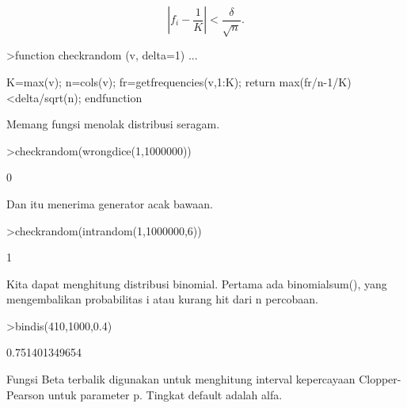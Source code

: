 \documentclass{article}
\begin{document}
\begin{eulernotebook}
\begin{eulercomment}
\begin{eulercomment}
\begin{eulercomment}
\end{eulercomment}
\begin{eulerformula}
\[
\left|f_i-\frac{1}{K}\right| < \frac{\delta}{\sqrt{n}}.
\]
\end{eulerformula}
\begin{eulerprompt}
>function checkrandom (v, delta=1) ...
\end{eulerprompt}
\begin{eulerudf}
    K=max(v); n=cols(v);
    fr=getfrequencies(v,1:K);
    return max(fr/n-1/K)<delta/sqrt(n);
    endfunction
\end{eulerudf}
\begin{eulercomment}
Memang fungsi menolak distribusi seragam.
\end{eulercomment}
\begin{eulerprompt}
>checkrandom(wrongdice(1,1000000))
\end{eulerprompt}
\begin{euleroutput}
  0
\end{euleroutput}
\begin{eulercomment}
Dan itu menerima generator acak bawaan.
\end{eulercomment}
\begin{eulerprompt}
>checkrandom(intrandom(1,1000000,6))
\end{eulerprompt}
\begin{euleroutput}
  1
\end{euleroutput}
\begin{eulercomment}
Kita dapat menghitung distribusi binomial. Pertama ada binomialsum(),
yang mengembalikan probabilitas i atau kurang hit dari n percobaan.
\end{eulercomment}
\begin{eulerprompt}
>bindis(410,1000,0.4)
\end{eulerprompt}
\begin{euleroutput}
  0.751401349654
\end{euleroutput}
\begin{eulercomment}
Fungsi Beta terbalik digunakan untuk menghitung interval kepercayaan
Clopper-Pearson untuk parameter p. Tingkat default adalah alfa.


\end{eulercomment}
\end{eulercomment}
\end{eulercomment}
\end{eulernotebook}
\end{document}
